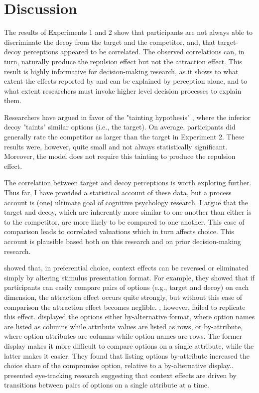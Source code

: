 \section{Discussion}

The results of Experiments 1 and 2 show that participants are not always able to discriminate the decoy from the target and the competitor, and, that target-decoy perceptions appeared to be correlated. The observed correlations can, in turn, naturally produce the repulsion effect but not the attraction effect. This result is highly informative for decision-making research, as it shows to what extent the effects reported by \textcite{trueblood2013not} and \textcite{spektorWhenGoodLooks2018b} can be explained by perception alone, and to what extent researchers must invoke higher level decision processes to explain them. 

Researchers have argued in favor of the "tainting hypothesis" \parencite{simonson2014vices,spektorWhenGoodLooks2018b}, where the inferior decoy "taints" similar options (i.e., the target). On average, participants did generally rate the competitor as larger than the target in Experiment 2. These results were, however, quite small and not always statistically significant. Moreover, the model does not require this tainting to produce the repulsion effect.

The correlation between target and decoy perceptions is worth exploring further. Thus far, I have provided a statistical account of these data, but a process account is (one) ultimate goal of cognitive psychology research. I argue that the target and decoy, which are inherently more similar to one another than either is to the competitor, are more likely to be compared to one another. This ease of comparison leads to correlated valuations which in turn affects choice. This account is plausible based both on this research and on prior decision-making research.

\textcite{cataldoComparisonProcessAccount2019b} showed that, in preferential choice, context effects can be reversed or eliminated simply by altering stimulus presentation format. For example, they showed that if participants can easily compare pairs of options (e.g., target and decoy) on each dimension, the attraction effect occurs quite strongly, but without this ease of comparison the attraction effect becomes neglible. \textcite{hasan2025registered}, however, failed to replicate this effect. \textcite{changWhichCompromiseOption2008} displayed the options either by-alternative format, where option names are listed as columns while attribute values are listed as rows, or by-attribute, where option attributes are columns while option names are rows. The former display makes it more difficult to compare options on a single attribute, while the latter makes it easier. They found that listing options by-attribute increased the choice share of the compromise option, relative to a by-alternative display.. \textcite{noguchi2014attraction} presented eye-tracking research suggesting that context effects are driven by transitions between pairs of options on a single attribute at a time. 

